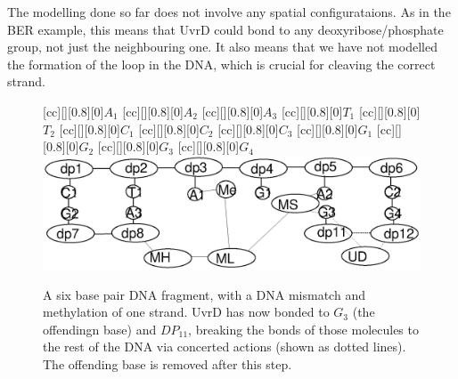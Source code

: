 The modelling done so far does not involve any spatial configurataions. As in the BER example, this means that UvrD could bond to any deoxyribose/phosphate group, not just the neighbouring one. It also means that we have not modelled the formation of the loop in the DNA, which is crucial for cleaving the correct strand.

\begin{figure}[h!]
[cc][][0.8][0]{${A_1}$}
[cc][][0.8][0]{${A_2}$}
[cc][][0.8][0]{${A_3}$}
[cc][][0.8][0]{${T_1}$}
[cc][][0.8][0]{${T_2}$}
[cc][][0.8][0]{${C_1}$}
[cc][][0.8][0]{${C_2}$}
[cc][][0.8][0]{${C_3}$}
[cc][][0.8][0]{${G_1}$}
[cc][][0.8][0]{${G_2}$}
[cc][][0.8][0]{${G_3}$}
[cc][][0.8][0]{${G_4}$}
  \centering
    \includegraphics[width=1.0\textwidth]{mmr/state6}
  \caption[A six base pair DNA fragment.]{A six base pair DNA fragment, with a DNA mismatch and methylation of one strand. UvrD has now bonded to $G_3$ (the offendingn base) and $DP_{11}$, breaking the bonds of those molecules to the rest of the DNA via concerted actions (shown as dotted lines). The offending base is removed after this step.}
  \label{fig:state6}
\end{figure}

